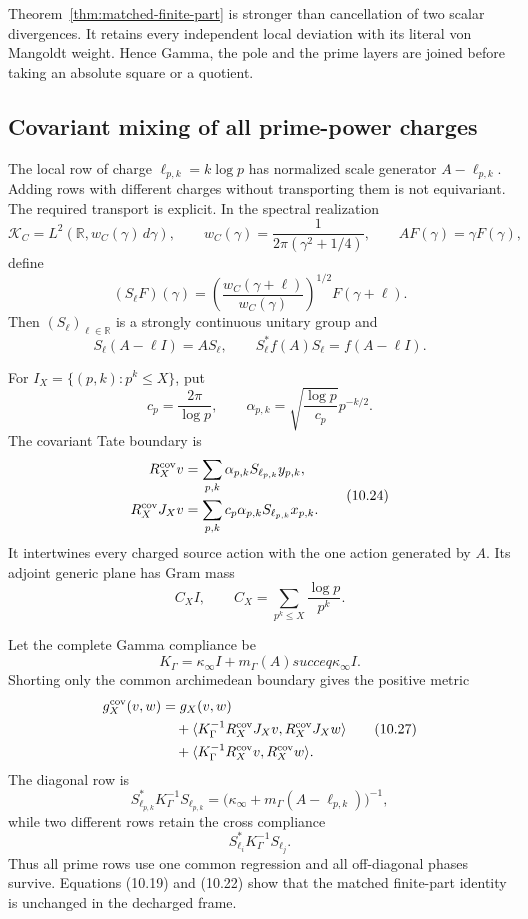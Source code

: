 \documentclass[11pt]{amsart}
\theoremstyle{definition}
\theoremstyle{remark}
\newcommand{\dd}{\,d}
\begin{document}
Theorem~\ref{thm:matched-finite-part} is stronger than cancellation of
two scalar divergences.  It retains every independent local deviation with
its literal von Mangoldt weight.  Hence Gamma, the pole and the prime
layers are joined before taking an absolute square or a quotient.

\subsection{Covariant mixing of all prime-power charges}

The local row of charge \(\ell_{p,k}=k\log p\) has normalized scale
generator \(A-\ell_{p,k}\).  Adding rows with different charges without
transporting them is not equivariant.  The required transport is explicit.
In the spectral realization
\[
 \mathscr K_C=L^2(\mathbb R,w_C(\gamma)\dd\gamma),
 \qquad
 w_C(\gamma)=\frac1{2\pi(\gamma^2+1/4)},
 \qquad AF(\gamma)=\gamma F(\gamma),
 \tag{10.20}
\]
define
\[
 (S_\ell F)(\gamma)
 =\left(\frac{w_C(\gamma+\ell)}{w_C(\gamma)}\right)^{1/2}
  F(\gamma+\ell).
 \tag{10.21}
\]
Then \((S_\ell)_{\ell\in\mathbb R}\) is a strongly continuous unitary
group and
\[
 S_\ell(A-\ell I)=AS_\ell,
 \qquad
 S_\ell^*f(A)S_\ell=f(A-\ell I).
 \tag{10.22}
\]

For \(I_X=\{(p,k):p^k\le X\}\), put
\[
 c_p=\frac{2\pi}{\log p},
 \qquad
 \alpha_{p,k}=\sqrt{\frac{\log p}{c_p}}p^{-k/2}.
 \tag{10.23}
\]
The covariant Tate boundary is
\[
 \begin{aligned}
 R_X^{\rm cov}v
 &=\sum_{p,k}\alpha_{p,k}S_{\ell_{p,k}}y_{p,k},\\
 R_X^{\rm cov}J_Xv
 &=\sum_{p,k}c_p\alpha_{p,k}S_{\ell_{p,k}}x_{p,k}.
 \end{aligned}
 \tag{10.24}
\]
It intertwines every charged source action with the one action generated
by \(A\).  Its adjoint generic plane has Gram mass
\[
 C_XI,
 \qquad
 C_X=\sum_{p^k\le X}\frac{\log p}{p^k}.
 \tag{10.25}
\]

Let the complete Gamma compliance be
\[
 K_\Gamma=\kappa_\infty I+m_\Gamma(A)succeq\kappa_\infty I.
 \tag{10.26}
\]
Shorting only the common archimedean boundary gives the positive metric
\[
 \begin{aligned}
 g_X^{\rm cov}(v,w)
 &=g_X(v,w)\\
 &\quad+\langle K_\Gamma^{-1}R_X^{\rm cov}J_Xv,
                         R_X^{\rm cov}J_Xw\rangle\\
 &\quad+\langle K_\Gamma^{-1}R_X^{\rm cov}v,
                         R_X^{\rm cov}w\rangle.
 \end{aligned}
 \tag{10.27}
\]
The diagonal row is
\[
 S_{\ell_{p,k}}^*K_\Gamma^{-1}S_{\ell_{p,k}}
 =\bigl(\kappa_\infty+m_\Gamma(A-\ell_{p,k})\bigr)^{-1},
 \tag{10.28}
\]
while two different rows retain the cross compliance
\[
 S_{\ell_i}^*K_\Gamma^{-1}S_{\ell_j}.
 \tag{10.29}
\]
Thus all prime rows use one common regression and all off-diagonal phases
survive.  Equations (10.19) and (10.22) show that the matched finite-part
identity is unchanged in the decharged frame.
\end{document}
